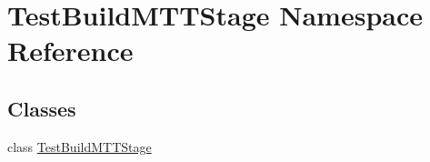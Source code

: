 \hypertarget{namespaceTestBuildMTTStage}{\section{Test\-Build\-M\-T\-T\-Stage Namespace Reference}
\label{namespaceTestBuildMTTStage}
}
\subsection*{Classes}
\begin{DoxyCompactItemize}
\item 
class \hyperlink{classTestBuildMTTStage_1_1TestBuildMTTStage}{Test\-Build\-M\-T\-T\-Stage}
\end{DoxyCompactItemize}
